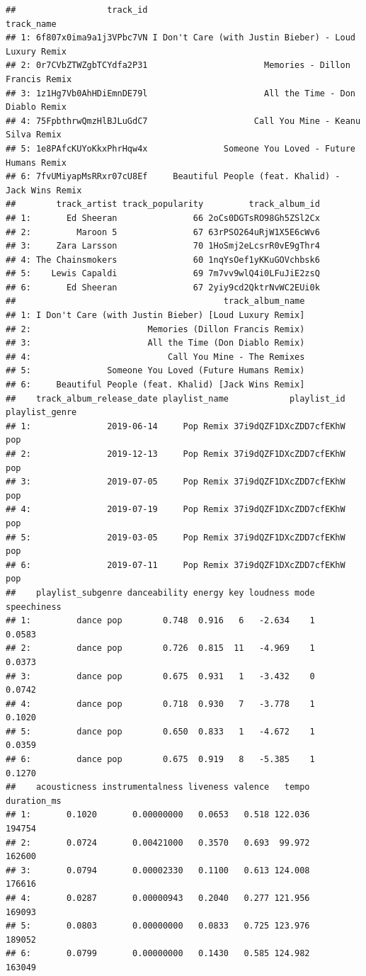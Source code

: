\documentclass[
  b5paper]{book}
\begin{document}
\begin{verbatim}
##                  track_id                                            track_name
## 1: 6f807x0ima9a1j3VPbc7VN I Don't Care (with Justin Bieber) - Loud Luxury Remix
## 2: 0r7CVbZTWZgbTCYdfa2P31                       Memories - Dillon Francis Remix
## 3: 1z1Hg7Vb0AhHDiEmnDE79l                       All the Time - Don Diablo Remix
## 4: 75FpbthrwQmzHlBJLuGdC7                     Call You Mine - Keanu Silva Remix
## 5: 1e8PAfcKUYoKkxPhrHqw4x               Someone You Loved - Future Humans Remix
## 6: 7fvUMiyapMsRRxr07cU8Ef     Beautiful People (feat. Khalid) - Jack Wins Remix
##        track_artist track_popularity         track_album_id
## 1:       Ed Sheeran               66 2oCs0DGTsRO98Gh5ZSl2Cx
## 2:         Maroon 5               67 63rPSO264uRjW1X5E6cWv6
## 3:     Zara Larsson               70 1HoSmj2eLcsrR0vE9gThr4
## 4: The Chainsmokers               60 1nqYsOef1yKKuGOVchbsk6
## 5:    Lewis Capaldi               69 7m7vv9wlQ4i0LFuJiE2zsQ
## 6:       Ed Sheeran               67 2yiy9cd2QktrNvWC2EUi0k
##                                         track_album_name
## 1: I Don't Care (with Justin Bieber) [Loud Luxury Remix]
## 2:                       Memories (Dillon Francis Remix)
## 3:                       All the Time (Don Diablo Remix)
## 4:                           Call You Mine - The Remixes
## 5:               Someone You Loved (Future Humans Remix)
## 6:     Beautiful People (feat. Khalid) [Jack Wins Remix]
##    track_album_release_date playlist_name            playlist_id playlist_genre
## 1:               2019-06-14     Pop Remix 37i9dQZF1DXcZDD7cfEKhW            pop
## 2:               2019-12-13     Pop Remix 37i9dQZF1DXcZDD7cfEKhW            pop
## 3:               2019-07-05     Pop Remix 37i9dQZF1DXcZDD7cfEKhW            pop
## 4:               2019-07-19     Pop Remix 37i9dQZF1DXcZDD7cfEKhW            pop
## 5:               2019-03-05     Pop Remix 37i9dQZF1DXcZDD7cfEKhW            pop
## 6:               2019-07-11     Pop Remix 37i9dQZF1DXcZDD7cfEKhW            pop
##    playlist_subgenre danceability energy key loudness mode speechiness
## 1:         dance pop        0.748  0.916   6   -2.634    1      0.0583
## 2:         dance pop        0.726  0.815  11   -4.969    1      0.0373
## 3:         dance pop        0.675  0.931   1   -3.432    0      0.0742
## 4:         dance pop        0.718  0.930   7   -3.778    1      0.1020
## 5:         dance pop        0.650  0.833   1   -4.672    1      0.0359
## 6:         dance pop        0.675  0.919   8   -5.385    1      0.1270
##    acousticness instrumentalness liveness valence   tempo duration_ms
## 1:       0.1020       0.00000000   0.0653   0.518 122.036      194754
## 2:       0.0724       0.00421000   0.3570   0.693  99.972      162600
## 3:       0.0794       0.00002330   0.1100   0.613 124.008      176616
## 4:       0.0287       0.00000943   0.2040   0.277 121.956      169093
## 5:       0.0803       0.00000000   0.0833   0.725 123.976      189052
## 6:       0.0799       0.00000000   0.1430   0.585 124.982      163049
\end{verbatim}
\end{document}
